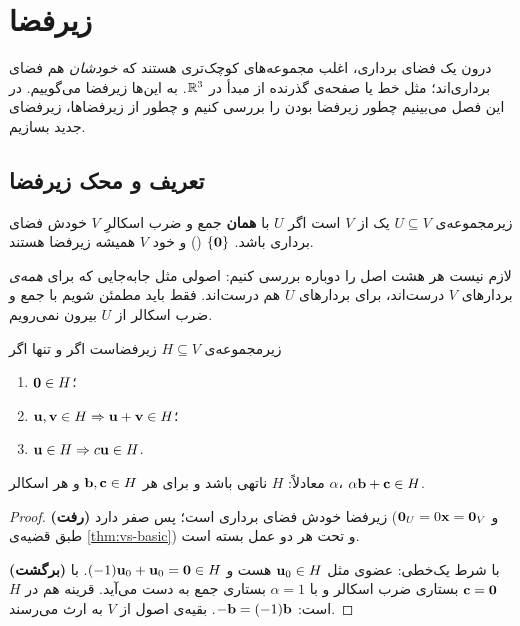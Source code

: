 \chapter{زیرفضا}
\label{ch:subspaces}

درون یک فضای برداری، اغلب مجموعه‌های کوچک‌تری هستند که \emph{خودشان} هم فضای برداری‌اند؛ مثل خط یا صفحه‌ی گذرنده از مبدأ در $\mathbb{R}^3$. به این‌ها زیرفضا می‌گوییم. در این فصل می‌بینیم چطور زیرفضا بودن را بررسی کنیم و چطور از زیرفضاها، زیرفضای جدید بسازیم.

\section{تعریف و محک زیرفضا}

\begin{definition}[زیرفضا]
زیرمجموعه‌ی $U\subseteq V$ یک  از $V$ است اگر $U$ با \textbf{همان} جمع و ضرب اسکالرِ $V$ خودش فضای برداری  باشد. $\{\mathbf{0}\}$ () و خود $V$ همیشه زیرفضا هستند.
\end{definition}

لازم نیست هر هشت اصل را دوباره بررسی کنیم: اصولی مثل جابه‌جایی که برای \emph{همه‌ی} بردارهای $V$ درست‌اند، برای بردارهای $U$ هم درست‌اند. فقط باید مطمئن شویم با جمع و ضرب اسکالر از $U$ بیرون نمی‌رویم.

\begin{theorem}\label{thm:subspace-test}
زیرمجموعه‌ی $H\subseteq V$ زیرفضاست اگر و تنها اگر
\begin{enumerate}
  \item $\mathbf{0}\in H$؛
  \item $\mathbf{u},\mathbf{v}\in H\Rightarrow\mathbf{u}+\mathbf{v}\in H$؛
  \item $\mathbf{u}\in H\Rightarrow c\mathbf{u}\in H$.
\end{enumerate}
معادلاً: $H$ ناتهی باشد و برای هر $\mathbf{b},\mathbf{c}\in H$ و هر اسکالر $\alpha$، $\alpha\mathbf{b}+\mathbf{c}\in H$.
\end{theorem}
\begin{proof}
\textbf{(رفت)} زیرفضا خودش فضای برداری است؛ پس صفر دارد (و $\mathbf{0}_U=0\mathbf{x}=\mathbf{0}_V$ طبق قضیه‌ی \ref{thm:vs-basic}) و تحت هر دو عمل بسته است.

\textbf{(برگشت)} با شرط یک‌خطی: عضوی مثل $\mathbf{u}_0\in H$ هست و $(-1)\mathbf{u}_0+\mathbf{u}_0=\mathbf{0}\in H$. با $\mathbf{c}=\mathbf{0}$ بستاری ضرب اسکالر و با $\alpha=1$ بستاری جمع به دست می‌آید. قرینه هم در $H$ است: $-\mathbf{b}=(-1)\mathbf{b}$. بقیه‌ی اصول از $V$ به ارث می‌رسند.
\end{proof}

